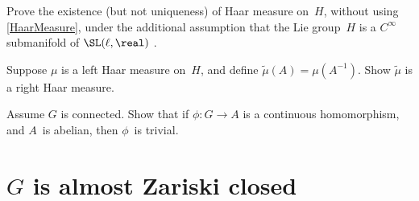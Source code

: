 \begin{exercises}

\item Prove the existence (but not uniqueness) of Haar measure on~$H$, without using \cref{HaarMeasure}, under the additional assumption that the Lie group~$H$ is a $C^\infty$ submanifold of $\SL(\ell,\real)$ .

\item \label{RightHaarMeasure}
Suppose $\mu$ is a left Haar measure on~$H$, and define $\widetilde\mu(A) = \mu(A^{-1})$. Show $\widetilde\mu$ is a right Haar measure.

\item \label{SS->perfect}
Assume $G$ is connected. Show that if $\phi \colon G \to A$ is a continuous homomorphism, and $A$~is abelian, then $\phi$~is trivial.

\end{exercises}




\section{\texorpdfstring{$G$}{G} is almost Zariski closed} \label{ZariskiSect}


